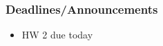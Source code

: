 
\begin{frame}
    \frametitle{Deadlines/Announcements}
    \begin{itemize}
        \item HW 2 due today
    \end{itemize}
\end{frame}
